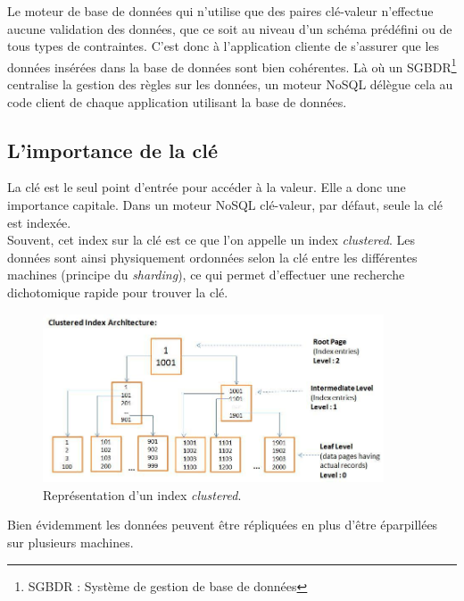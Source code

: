 	Le moteur de base de données qui n'utilise que des paires clé-valeur n'effectue aucune validation des données, que ce soit au niveau d'un schéma prédéfini ou de tous types de contraintes. C'est donc à l'application cliente de s'assurer que les données insérées dans la base de données sont bien cohérentes. Là où un SGBDR\footnote{SGBDR : Système de gestion de base de données} centralise la gestion des règles sur les données, un moteur NoSQL délègue cela au code client de chaque application utilisant la base de données.

\subsection{L'importance de la clé}
	La clé est le seul point d'entrée pour accéder à la valeur. Elle a donc une importance capitale. Dans un moteur NoSQL clé-valeur, par défaut, seule la clé est indexée.\\

	Souvent, cet index sur la clé est ce que l'on appelle un index \textit{clustered}. Les données sont ainsi physiquement ordonnées selon la clé entre les différentes machines (principe du \textit{sharding}), ce qui permet d'effectuer une recherche dichotomique rapide pour trouver la clé.

	\begin{figure}[H]
		\centering
		\includegraphics[width=0.9\textwidth]{images/clusteredIndex.jpg}
		\caption{Représentation d'un index \textit{clustered}.}
	\end{figure}

	Bien évidemment les données peuvent être répliquées en plus d'être éparpillées sur plusieurs machines.
